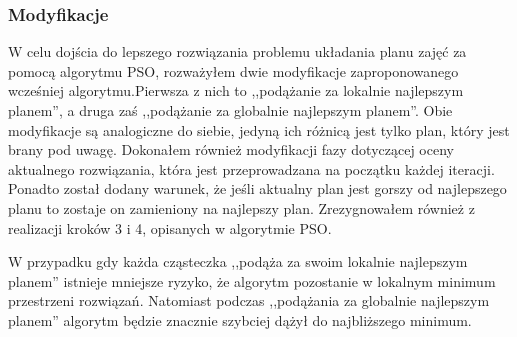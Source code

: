 \subsubsection{Modyfikacje}
\par W celu dojścia do lepszego rozwiązania problemu układania planu zajęć za pomocą algorytmu PSO, rozważyłem dwie modyfikacje zaproponowanego wcześniej algorytmu.Pierwsza z nich to  ,,podążanie za lokalnie najlepszym planem'', a druga zaś ,,podążanie za globalnie najlepszym planem''. Obie modyfikacje są analogiczne do siebie, jedyną ich różnicą jest tylko plan, który jest brany pod uwagę. Dokonałem również modyfikacji fazy dotyczącej oceny aktualnego rozwiązania, która jest przeprowadzana na początku każdej iteracji. Ponadto został dodany warunek, że jeśli aktualny plan jest gorszy od najlepszego planu to zostaje on zamieniony na najlepszy plan. Zrezygnowałem również z realizacji kroków 3 i 4, opisanych w algorytmie PSO.

\par W przypadku gdy każda cząsteczka ,,podąża za swoim lokalnie najlepszym planem'' istnieje mniejsze ryzyko, że algorytm pozostanie w lokalnym minimum przestrzeni rozwiązań. Natomiast podczas ,,podążania za globalnie najlepszym planem'' algorytm będzie znacznie szybciej dążył do najbliższego minimum.

